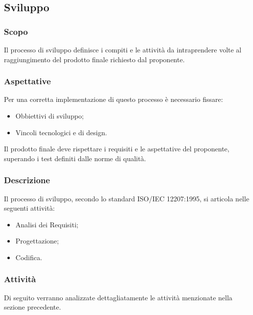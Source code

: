 \subsection{Sviluppo}
		\subsubsection{Scopo}
			Il processo di sviluppo definisce i compiti e le attività da intraprendere volte al raggiungimento del prodotto finale richiesto dal proponente.
		\subsubsection{Aspettative}
			Per una corretta implementazione di questo processo è necessario fissare:
				\begin{itemize}
					\item Obbiettivi di sviluppo;
					\item Vincoli tecnologici e di design.
				\end{itemize}	
			Il prodotto finale deve rispettare i requisiti e le aspettative del proponente, superando i test definiti dalle norme di qualità.
		\subsubsection{Descrizione}
			Il processo di sviluppo, secondo lo standard ISO/IEC 12207:1995, si articola nelle seguenti attività:
				\begin{itemize}
					\item Analisi dei Requisiti;
					\item Progettazione;
					\item Codifica.
				\end{itemize}
			
		\subsubsection{Attività}
			Di seguito verranno analizzate dettagliatamente le attività menzionate nella sezione precedente.
